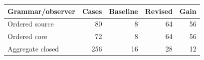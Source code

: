 \begin{tabular}{lrrrr}
\hline
Grammar/observer & Cases & Baseline & Revised & Gain \\
\hline
Ordered source & 80 & 8 & 64 & 56 \\
Ordered core & 72 & 8 & 64 & 56 \\
Aggregate closed & 256 & 16 & 28 & 12 \\
\hline
\end{tabular}

